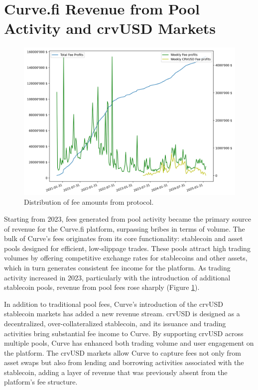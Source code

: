 \documentclass[notitlepage]{revtex4-2}
\begin{document}
\section{Curve.fi Revenue from Pool Activity and crvUSD Markets}

\begin{figure}[ht]
    \centering
    \includegraphics[width=\linewidth]{images/CRV_fee}
    \caption{Distribution of fee amounts from protocol.}
    \label{fig:fee_distribution}
\end{figure}

Starting from 2023, fees generated from pool activity became the primary source of revenue for the Curve.fi platform,
surpassing bribes in terms of volume. The bulk of Curve’s fees originates from its core functionality: stablecoin and
asset pools designed for efficient, low-slippage trades. These pools attract high trading volumes by offering
competitive exchange rates for stablecoins and other assets, which in turn generates consistent fee income for the
platform. As trading activity increased in 2023, particularly with the introduction of additional stablecoin pools,
revenue from pool fees rose sharply (Figure \ref{fig:fee_distribution}).

In addition to traditional pool fees, Curve’s introduction of the crvUSD stablecoin markets has added a new revenue
stream. crvUSD is designed as a decentralized, over-collateralized stablecoin, and its issuance and trading activities
bring substantial fee income to Curve. By supporting crvUSD across multiple pools, Curve has enhanced both trading
volume and user engagement on the platform. The crvUSD markets allow Curve to capture fees not only from asset swaps
but also from lending and borrowing activities associated with the stablecoin, adding a layer of revenue that was
previously absent from the platform’s fee structure.
\end{document}
